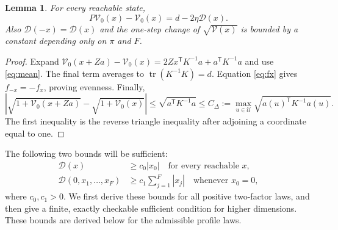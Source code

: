 \documentclass[12pt,a4paper]{article}
\newtheorem{lemma}{Lemma}
\theoremstyle{definition}
\theoremstyle{remark}\newtheorem{remark}{Remark}
\numberwithin{equation}{section}
\newcommand{\trans}{^{\mathsf T}}
\begin{document}
\begin{lemma}\label{lem:drift}
For every reachable state,
\begin{equation}\label{eq:quadratic-drift}
 P\mathcal V_0(x)-\mathcal V_0(x)=d-2\eta \mathcal D(x).
\end{equation}
Also $\mathcal D(-x)=\mathcal D(x)$ and the one-step change of $\sqrt{\mathcal V(x)}$ is bounded by a constant depending only on $\pi$ and $F$.
\end{lemma}
\begin{proof}
Expand $\mathcal V_0(x+Za)-\mathcal V_0(x)=2Zx\trans K^{-1}a+a\trans K^{-1}a$ and use \eqref{eq:mean}. The final term averages to $\operatorname{tr}(K^{-1}K)=d$. Equation \eqref{eq:fx} gives $f_{-x}=-f_x$, proving evenness. Finally,
\[
 |\sqrt{1+\mathcal V_0(x+Za)}-\sqrt{1+\mathcal V_0(x)}|
 \le \sqrt{a\trans K^{-1}a}
 \le C_\Delta:=\max_{u\in\mathcal U}\sqrt{a(u)\trans K^{-1}a(u)}.
\]
The first inequality is the reverse triangle inequality after adjoining a coordinate equal to one.
\end{proof}

The following two bounds will be sufficient:
\begin{align}
 \mathcal D(x)&\ge c_0|x_0|\quad\text{for every reachable }x, \label{eq:H1}\\
 \mathcal D(0,x_1,\ldots,x_F)&\ge c_1\sum_{j=1}^F|x_j|\quad\text{whenever }x_0=0, \label{eq:H2}
\end{align}
where $c_0,c_1>0$. We first derive these bounds for all positive two-factor laws, and then give a finite, exactly checkable sufficient condition for higher dimensions. These bounds are derived below for the admissible profile laws.
\end{document}
